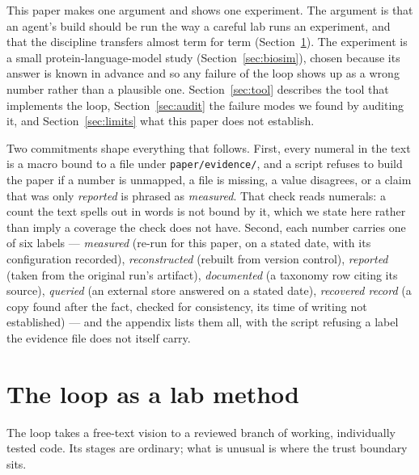 \documentclass[10pt]{article}
\begin{document}
This paper makes one argument and shows one experiment. The argument is that an agent's build should be run the way a careful lab runs an experiment, and that the discipline transfers almost term for term (Section~\ref{sec:method}). The experiment is a small protein-language-model study (Section~\ref{sec:biosim}), chosen because its answer is known in advance and so any failure of the loop shows up as a wrong number rather than a plausible one. Section~\ref{sec:tool} describes the tool that implements the loop, Section~\ref{sec:audit} the failure modes we found by auditing it, and Section~\ref{sec:limits} what this paper does not establish.

Two commitments shape everything that follows. First, every numeral in the text is a macro bound to a file under \texttt{paper/evidence/}, and a script refuses to build the paper if a number is unmapped, a file is missing, a value disagrees, or a claim that was only \emph{reported} is phrased as \emph{measured}. That check reads numerals: a count the text spells out in words is not bound by it, which we state here rather than imply a coverage the check does not have. Second, each number carries one of six labels --- \emph{measured} (re-run for this paper, on a stated date, with its configuration recorded), \emph{reconstructed} (rebuilt from version control), \emph{reported} (taken from the original run's artifact), \emph{documented} (a taxonomy row citing its source), \emph{queried} (an external store answered on a stated date), \emph{recovered record} (a copy found after the fact, checked for consistency, its time of writing not established) --- and the appendix lists them all, with the script refusing a label the evidence file does not itself carry.

\section{The loop as a lab method}\label{sec:method}

The loop takes a free-text vision to a reviewed branch of working, individually tested code. Its stages are ordinary; what is unusual is where the trust boundary sits.

\begin{center}
\resizebox{\linewidth}{!}{}
\end{center}
\end{document}
